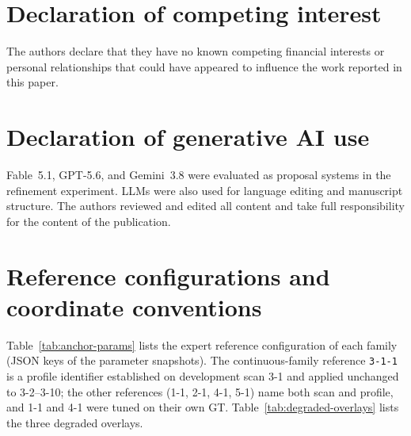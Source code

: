 \documentclass[a4paper,fleqn]{cas-dc}
\begin{document}
\section*{Declaration of competing interest}

The authors declare that they have no known competing financial interests or personal relationships that could have appeared to influence the work reported in this paper.

\section*{Declaration of generative AI use}

Fable~5.1, GPT-5.6, and Gemini~3.8 were evaluated as proposal systems in the refinement experiment. LLMs were also used for language editing and manuscript structure. The authors reviewed and edited all content and take full responsibility for the content of the publication.




\appendix

\section{Reference configurations and coordinate conventions}\label{app:anchor-parameter}

Table~\ref{tab:anchor-params} lists the expert reference configuration of each family (JSON keys of the parameter snapshots). The continuous-family reference \texttt{3-1-1} is a profile identifier established on development scan 3-1 and applied unchanged to 3-2--3-10; the other references (1-1, 2-1, 4-1, 5-1) name both scan and profile, and 1-1 and 4-1 were tuned on their own GT. Table~\ref{tab:degraded-overlays} lists the three degraded overlays.
\end{document}
